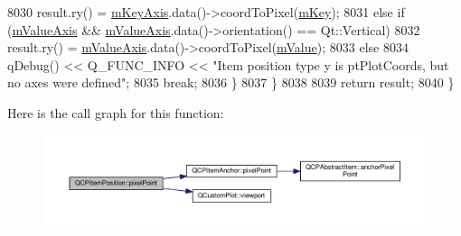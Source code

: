 \begin{DoxyCode}
8030         result.ry() = \hyperlink{class_q_c_p_item_position_a63967a33933231e92f68c8ce06bfc37e}{mKeyAxis}.data()->coordToPixel(\hyperlink{class_q_c_p_item_position_a4ff3931ad115603dfb4c7000b24bb415}{mKey});
8031       \textcolor{keywordflow}{else} \textcolor{keywordflow}{if} (\hyperlink{class_q_c_p_item_position_a505dc2da24ba274452c1c817fcaba011}{mValueAxis} && \hyperlink{class_q_c_p_item_position_a505dc2da24ba274452c1c817fcaba011}{mValueAxis}.data()->orientation() == Qt::Vertical)
8032         result.ry() = \hyperlink{class_q_c_p_item_position_a505dc2da24ba274452c1c817fcaba011}{mValueAxis}.data()->coordToPixel(\hyperlink{class_q_c_p_item_position_a67bf5df69f587d53731724a7d61c6c3f}{mValue});
8033       \textcolor{keywordflow}{else}
8034         qDebug() << Q\_FUNC\_INFO << \textcolor{stringliteral}{"Item position type y is ptPlotCoords, but no axes were defined"};
8035       \textcolor{keywordflow}{break};
8036     \}
8037   \}
8038   
8039   \textcolor{keywordflow}{return} result;
8040 \}
\end{DoxyCode}


Here is the call graph for this function\+:\nopagebreak
\begin{figure}[H]
\begin{center}
\leavevmode
\includegraphics[width=350pt]{class_q_c_p_item_position_ae490f9c76ee2ba33752c495d3b6e8fb5_cgraph}
\end{center}
\end{figure}




